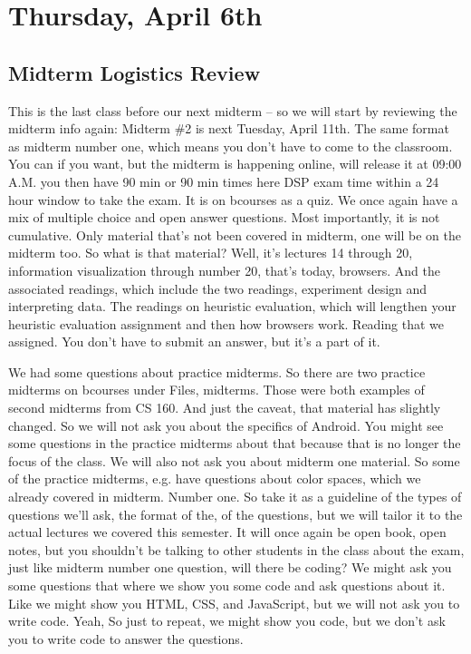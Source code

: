 \section{Thursday, April 6th}
\subsection{Midterm Logistics Review}
This is the last class before our next midterm -- so we will start by reviewing the midterm info again: Midterm \#2 is next Tuesday, April 11th. The same format as midterm number one, which means you don't have to come to the classroom. You can if you want, but the midterm is happening online, will release it at 09:00 A.M. you then have 90 min or 90 min times here DSP exam time within a 24 hour window to take the exam. It is on bcourses as a quiz. We once again have a mix of multiple choice and open answer questions. Most importantly, it is not cumulative. Only material that's not been covered in midterm, one will be on the midterm too. So what is that material? Well, it's lectures 14 through 20, information visualization through number 20, that's today, browsers. And the associated readings, which include the two readings, experiment design and interpreting data. The readings on heuristic evaluation, which will lengthen your heuristic evaluation assignment and then how browsers work. Reading that we assigned. You don't have to submit an answer, but it's a part of it. 

We had some questions about practice midterms. So there are two practice midterms on bcourses under Files, midterms. Those were both examples of second midterms from CS 160. And just the caveat, that material has slightly changed. So we will not ask you about the specifics of Android. You might see some questions in the practice midterms about that because that is no longer the focus of the class. We will also not ask you about midterm one material. So some of the practice midterms, e.g. have questions about color spaces, which we already covered in midterm. Number one. So take it as a guideline of the types of questions we'll ask, the format of the, of the questions, but we will tailor it to the actual lectures we covered this semester. It will once again be open book, open notes, but you shouldn't be talking to other students in the class about the exam, just like midterm number one question, will there be coding? We might ask you some questions that where we show you some code and ask questions about it. Like we might show you HTML, CSS, and JavaScript, but we will not ask you to write code. Yeah, So just to repeat, we might show you code, but we don't ask you to write code to answer the questions. 
